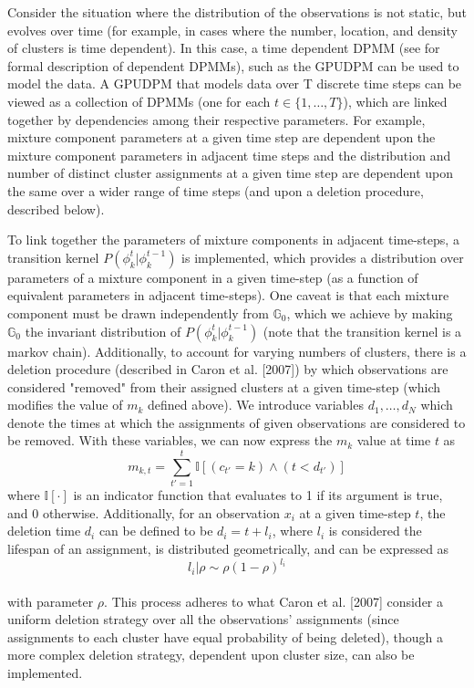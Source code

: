 \documentclass{article}
\begin{document}
Consider the situation where the distribution of the observations is not static, but evolves over time (for example, in cases where the number, location, and density of clusters is time dependent). In this case, a time dependent DPMM (see \cite{griffinsteel} for formal description of dependent DPMMs), such as the GPUDPM can be used to model the data. A GPUDPM that models data over T discrete time steps can be viewed as a collection of DPMMs (one for each $t \in \{1, \ldots, T \}$), which are linked together by dependencies among their respective parameters. For example, mixture component parameters at a given time step are dependent upon the mixture component parameters in adjacent time steps and the distribution and number of distinct cluster assignments at a given time step are dependent upon the same over a wider range of time steps (and upon a deletion procedure, described below).

To link together the parameters of mixture components in adjacent time-steps, a transition kernel $P(\phi_{k}^{t} | \phi_{k}^{t-1})$ is implemented, which provides a distribution over parameters of a mixture component in a given time-step (as a function of equivalent parameters in adjacent time-steps). One caveat is that each mixture component must be drawn independently from $\mathbb{G}_{0}$, which we achieve by making $\mathbb{G}_{0}$ the invariant distribution of $P(\phi_{k}^{t} | \phi_{k}^{t-1})$ (note that the transition kernel is a markov chain). Additionally, to account for varying numbers of clusters, there is a deletion procedure (described in Caron et al. [2007]) by which observations are considered "removed" from their assigned clusters at a given time-step (which modifies the value of $m_{k}$ defined above). We introduce variables $d_{1}, \ldots, d_{N}$ which denote the times at which the assignments of given observations are considered to be removed. With these variables, we can now express the $m_{k}$ value at time $t$ as
\begin{equation}
m_{k,t} = \sum_{t' = 1}^{t} \mathbb{I}[(c_{t'}=k) \wedge (t < d_{t'})]
\end{equation}
where $\mathbb{I}[\cdot]$ is an indicator function that evaluates to 1 if its argument is true, and 0 otherwise. Additionally, for an observation $x_{i}$ at a given time-step $t$, the deletion time $d_{i}$ can be defined to be $d_{i} = t + l_{i}$, where $l_{i}$ is considered the lifespan of an assignment, is distributed geometrically, and can be expressed as
\begin{equation}
l_{i} | \rho  \sim  \rho(1 - \rho)^{l_{i}}
\end{equation} \\
with parameter $\rho$. This process adheres to what Caron et al. [2007] consider a uniform deletion strategy over all the observations' assignments (since assignments to each cluster have equal probability of being deleted), though a more complex deletion strategy, dependent upon cluster size, can also be implemented.
\end{document}
